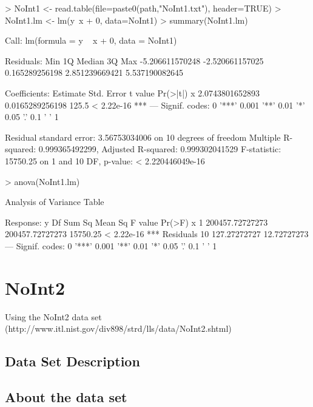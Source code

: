 \documentclass[10pt]{article}
\begin{document}
\begin{Schunk}
\begin{Sinput}
> NoInt1 <- read.table(file=paste0(path,"NoInt1.txt"), header=TRUE)
> NoInt1.lm <- lm(y~x + 0, data=NoInt1)
> summary(NoInt1.lm)
\end{Sinput}
\begin{Soutput}
Call:
lm(formula = y ~ x + 0, data = NoInt1)

Residuals:
            Min              1Q          Median              3Q             Max 
-5.206611570248 -2.520661157025  0.165289256198  2.851239669421  5.537190082645 

Coefficients:
         Estimate      Std. Error t value   Pr(>|t|)    
x 2.0743801652893 0.0165289256198   125.5 < 2.22e-16 ***
---
Signif. codes:  0 '***' 0.001 '**' 0.01 '*' 0.05 '.' 0.1 ' ' 1

Residual standard error: 3.56753034006 on 10 degrees of freedom
Multiple R-squared:  0.999365492299,	Adjusted R-squared:  0.999302041529 
F-statistic:      15750.25 on 1 and 10 DF,  p-value: < 2.220446049e-16
\end{Soutput}
\begin{Sinput}
> anova(NoInt1.lm)
\end{Sinput}
\begin{Soutput}
Analysis of Variance Table

Response: y
          Df          Sum Sq         Mean Sq  F value     Pr(>F)    
x          1 200457.72727273 200457.72727273 15750.25 < 2.22e-16 ***
Residuals 10    127.27272727     12.72727273                        
---
Signif. codes:  0 '***' 0.001 '**' 0.01 '*' 0.05 '.' 0.1 ' ' 1
\end{Soutput}
\end{Schunk}

\section{NoInt2}
Using the NoInt2 data set (http://www.itl.nist.gov/div898/strd/lls/data/NoInt2.shtml)

\subsection*{Data Set Description}



\subsection*{About the data set}
\end{document}
